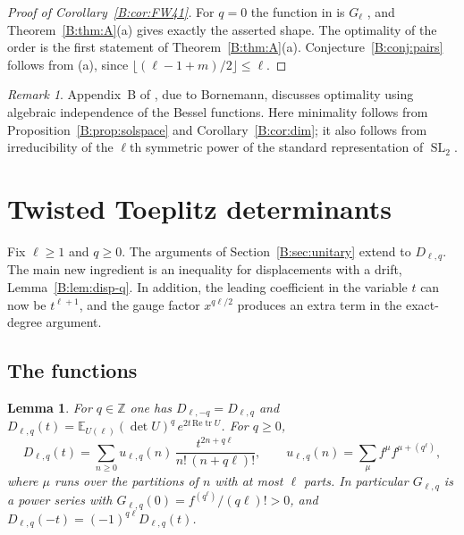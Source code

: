 \documentclass[11pt,a4paper]{article}
\newtheorem{lemma}[theorem]{Lemma}
\theoremstyle{definition}
\theoremstyle{remark}
\newtheorem{remark}[theorem]{Remark}
\newcommand{\Z}{\mathbb Z}
\newcommand{\E}{\mathbb E}
\newcommand{\fl}[1]{\lfloor #1\rfloor}
\DeclareMathOperator{\SL}{SL}
\DeclareMathOperator{\tr}{tr}
\numberwithin{equation}{section}
\begin{document}
\begin{proof}[Proof of Corollary~\ref{B:cor:FW41}]
For $q=0$ the function in \cite[Prop.~4.1]{FW26} is $G_\ell$ \cite[(4.6)]{FW26}, and Theorem~\ref{B:thm:A}(a) gives exactly the asserted shape. The optimality of the order is the first statement of Theorem~\ref{B:thm:A}(a). Conjecture~\ref{B:conj:pairs} follows from (a), since $\fl{(\ell-1+m)/2}\le\ell$.
\end{proof}

\begin{remark}
Appendix~B of \cite{FW26}, due to Bornemann, discusses optimality using algebraic independence of the Bessel functions. Here minimality follows from Proposition~\ref{B:prop:solspace} and Corollary~\ref{B:cor:dim}; it also follows from irreducibility of the $\ell$th symmetric power of the standard representation of $\SL_2$.
\end{remark}

\section{Twisted Toeplitz determinants}\label{B:sec:twisted}

Fix $\ell\ge1$ and $q\ge0$. The arguments of Section~\ref{B:sec:unitary} extend to $D_{\ell,q}$. The main new ingredient is an inequality for displacements with a drift, Lemma~\ref{B:lem:disp-q}. In addition, the leading coefficient in the variable $t$ can now be $t^{\ell+1}$, and the gauge factor $x^{q\ell/2}$ produces an extra term in the exact-degree argument.

\subsection{The functions}

\begin{lemma}\label{B:lem:twisted-expansion}
For $q\in\Z$ one has $D_{\ell,-q}=D_{\ell,q}$ and $D_{\ell,q}(t)=\E_{U(\ell)}(\det U)^q\,e^{2t\,\mathrm{Re}\tr U}$. For $q\ge0$,
\[
D_{\ell,q}(t)=\sum_{n\ge0}u_{\ell,q}(n)\,\frac{t^{2n+q\ell}}{n!\,(n+q\ell)!},\qquad u_{\ell,q}(n)=\sum_{\mu}f^{\mu}f^{\mu+(q^\ell)},
\]
where $\mu$ runs over the partitions of $n$ with at most $\ell$ parts. In particular $G_{\ell,q}$ is a power series with $G_{\ell,q}(0)=f^{(q^\ell)}/(q\ell)!>0$, and $D_{\ell,q}(-t)=(-1)^{q\ell}D_{\ell,q}(t)$.
\end{lemma}
\end{document}
